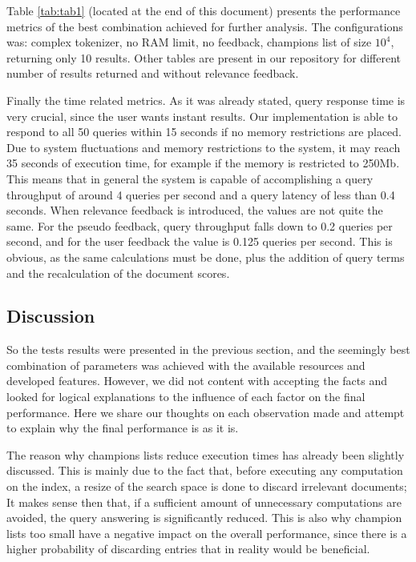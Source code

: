 \documentclass[12pt]{article}
\begin{document}
Table \ref{tab:tab1} (located at the end of this document) presents the performance 
metrics of the best combination achieved for further analysis.
The configurations was: complex tokenizer, no RAM limit, no feedback, champions list of
size $10^4$, returning only 10 results.
Other tables are present in our repository for different number of results returned 
and without relevance feedback.

Finally the time related metrics. 
As it was already stated, query response time is very crucial, since the user wants 
instant results.
Our implementation is able to respond to all 50 queries within 15 seconds if no 
memory restrictions are placed. 
Due to system fluctuations and memory restrictions to the system, it may reach 
35 seconds of execution time, for example if the memory is restricted to 250Mb.
This means that in general the system is capable of accomplishing a query 
throughput of around 4 queries per second and a query latency of less than 0.4 seconds.
When relevance feedback is introduced, the values are not quite the same.
For the pseudo feedback, query throughput falls down to 0.2 queries per second,
and for the user feedback the value is 0.125 queries per second.
This is obvious, as the same calculations must be done, plus the addition of query 
terms and the recalculation of the document scores.

\subsection{Discussion}\label{discussion}

So the tests results were presented in the previous section, and the seemingly
best combination of parameters was achieved with the available resources and 
developed features.
However, we did not content with accepting the facts and looked for logical
explanations to the influence of each factor on the final performance.
Here we share our thoughts on each observation made and attempt to explain why
the final performance is as it is.

The reason why champions lists reduce execution times has already been slightly 
discussed. 
This is mainly due to the fact that, before executing any computation on the index,
a resize of the search space is done to discard irrelevant documents;
It makes sense then that, if a sufficient amount of unnecessary computations are 
avoided, the query answering is significantly reduced.
This is also why champion lists too small have a negative impact on the overall 
performance, since there is a higher probability of discarding entries that in 
reality would be beneficial.
\end{document}
